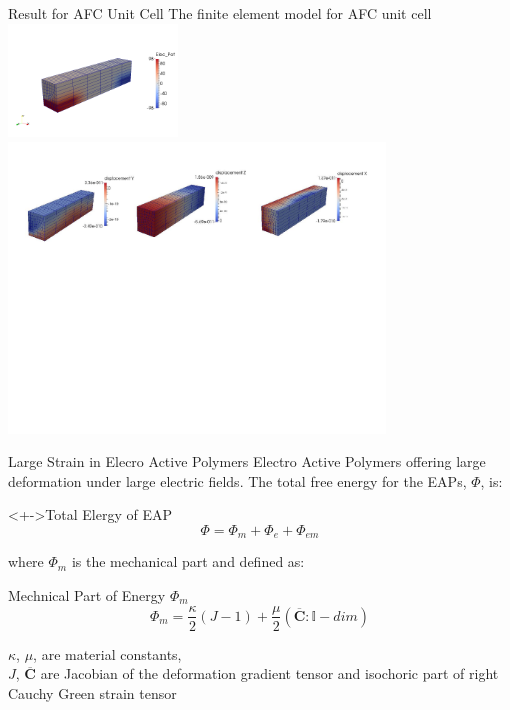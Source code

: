 \documentclass{beamer}
\begin{document}
\begin{frame}{Result for AFC Unit Cell }
The finite element model for AFC unit cell\\ 
\includegraphics[height=3cm]{../images/afc_epot.png}\\      
\includegraphics[width=10cm]{../images/afc_displacement_all.pdf}\\  
\end{frame}

\begin{frame}{Large Strain in Elecro Active Polymers}
Electro Active Polymers offering large deformation under large electric fields. 
The total free energy for the EAPs, $\Phi$, is:
\begin{block}<+->{Total Elergy of EAP}
\begin{equation}
\Phi=\Phi_{m}+\Phi_{e}+\Phi_{em}
\label{EQN:TotalEnergy}
\end{equation}
\end{block} 
where $\Phi_{m}$ is the mechanical part and defined as:
\begin{block}{Mechnical Part of Energy $\Phi_{m}$}
\begin{equation}
\Phi_{m}=\frac{\kappa}{2} (J-1)+\frac{\mu}{2} (\overline{\mathbf{C}}:\mathbb{I}-dim)
\label{EQN:eap_mechanical_part}
\end{equation}
\end{block} 
$\kappa$, $\mu$, \small are material constants, \\
$J$, $\overline{\mathbf{C}}$ \small are Jacobian of the deformation gradient
tensor and isochoric part of right Cauchy Green strain tensor
\end{frame}
\end{document}
